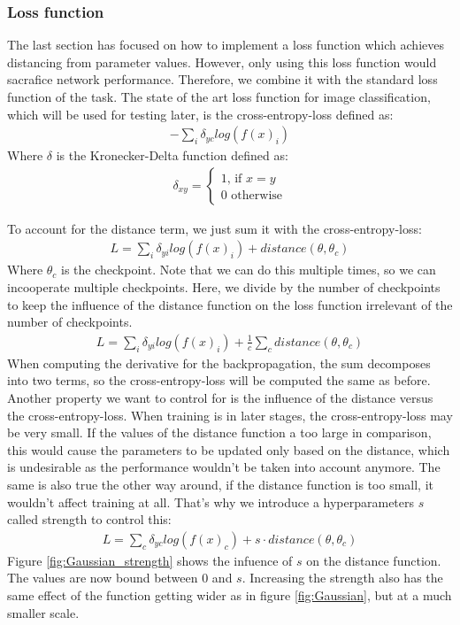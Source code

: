 \subsubsection{Loss function}\label{sub:Loss_function}
The last section has focused on how to implement a loss function which achieves
distancing from parameter values. However, only using this loss function would
sacrafice network performance. Therefore, we combine it with the standard loss
function of the task. The state of the art loss function for image
classification, which will be used for testing later, is the cross-entropy-loss
defined as:
\begin{align}
    -\sum_{i} \delta_{yc} log(f(x)_i)
\end{align}
Where $\delta$ is the Kronecker-Delta function defined as:
\begin{align}
    \delta_{xy} =
    \begin{cases}
        1 \textrm{, if } x=y \\
        0 \textrm{ otherwise}
    \end{cases}
\end{align}

To account for the distance term, we just sum it with the cross-entropy-loss:
\begin{align}\label{eq:Loss_distance}
    L=\sum_{i} \delta_{yi} log(f(x)_i) + distance(\theta, \theta_c)
\end{align}
Where $\theta_c$ is the checkpoint. Note that we can do this multiple times, so
we can incooperate multiple checkpoints. Here, we divide by the number of
checkpoints to keep the influence of the distance function on the loss function
irrelevant of the number of checkpoints.
\begin{align}
    L=\sum_{i} \delta_{yi} log(f(x)_i) + \frac{1}{c} \sum_c distance(\theta, \theta_c)
\end{align}
When computing the derivative for the backpropagation, the sum
decomposes into two terms, so the cross-entropy-loss will be computed the same
as before. Another property we want to control for is the influence of the
distance versus the cross-entropy-loss. When training is in later stages, the
cross-entropy-loss may be very small. If the values of the distance function a
too large in comparison, this would cause the parameters to be updated only
based on the distance, which is undesirable as the performance wouldn't be taken
into account anymore. The same is also true the other way around, if the
distance function is too small, it wouldn't affect training at all. That's why
we introduce a hyperparameters $s$ called strength to control this:
\begin{align}\label{eq:Loss_strength}
    L=\sum_{c} \delta_{yc} log(f(x)_c) + s \cdot distance(\theta, \theta_c)
\end{align}
Figure \ref{fig:Gaussian_strength} shows the infuence of $s$ on the distance
function. The values are now bound between 0 and $s$. Increasing the strength
also has the same effect of the function getting wider as in figure
\ref{fig:Gaussian}, but at a much smaller scale. 

